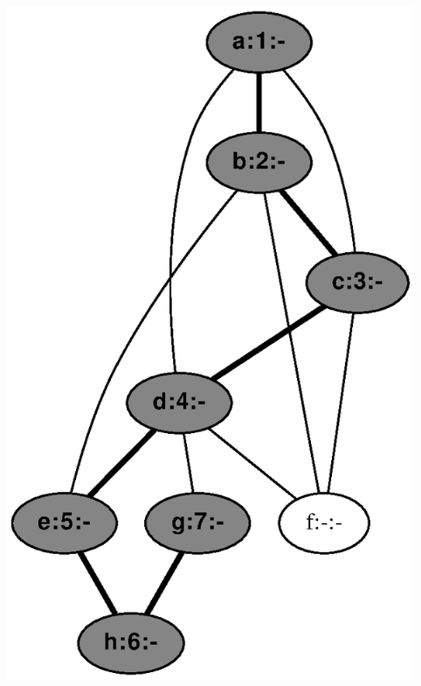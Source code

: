 \documentclass{article}
\begin{document}
\includegraphics[height=.3\textheight]{dfs_undirected_classroom_07.eps}
\vspace{1em}
\end{document}
